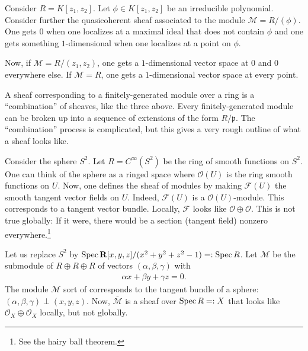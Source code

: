 \documentclass [11 pt, oneside] {article}
\begin{document}
\begin{example}[ ]\label{}\text{}
Consider $R= K[z_1,z_2]$. Let $\phi\in K[z_1,z_2]$ be an irreducible polynomial. Consider further the quasicoherent sheaf associated to the module $\mathscr{M}= R/(\phi)$. One gets $0$ when one localizes at a maximal ideal that does not contain $\phi$ and one gets something $1$-dimensional when one localizes at a point on $\phi$.

Now, if $\mathscr{M}=R/(z_1,z_2)$, one gets a $1$-dimensional vector space at $0$ and $0$ everywhere else. If $\mathscr{M}=R$, one gets a $1$-dimensional vector space at every point.
\end{example}

\begin{remark}
	A sheaf corresponding to a finitely-generated module over a ring is a ``combination'' of sheaves, like the three above. Every finitely-generated module can be broken up into a sequence of extensions of the form $R/\mathfrak{p}$. The ``combination'' process is complicated, but this gives a very rough outline of what a sheaf looks like.
\end{remark}

\begin{example}[ ]\label{}\text{}
Consider the sphere $S^2$. Let $R= C^\infty(S^2)$ be the ring of smooth functions on $S^2$. One can think of the sphere as a ringed space where $\mathscr{O}(U)$ is the ring smooth functions on $U$. Now, one defines the sheaf of modules by making $\mathscr{F}(U)$ the smooth tangent vector fields on $U$. Indeed, $\mathscr{F}(U)$ is a $\mathscr{O}(U)$-module. This corresponds to a tangent vector bundle. Locally, $\mathscr{F}$ looks like $\mathscr{O}\oplus \mathscr{O}$. This is not true globally: If it were, there would be a section (tangent field) nonzero everywhere.\footnote{See the hairy ball theorem.} 
\end{example}

\begin{example}[ ]\label{}\text{}
Let us replace $S^2$ by $\operatorname{Spec} \mathbf{R}[x,y,z]/(x^2+y^2+z^2-1) =:\operatorname{Spec} R$. Let $\mathscr{M}$ be the submodule of $R\oplus R\oplus R$ of vectors $(\alpha,\beta,\gamma)$ with
\begin{align*}
	\alpha x + \beta y + \gamma z =0.
\end{align*}
The module $\mathscr{M}$ sort of corresponds to the tangent bundle of a sphere: $(\alpha,\beta,\gamma)\perp  (x,y,z)$. Now, $\overline{\mathscr{M}}$ is a sheaf over $\operatorname{Spec} R=:X$ that looks like $\mathscr{O}_X\oplus \mathscr{O}_X$ locally, but not globally.
\end{example}
\end{document}
